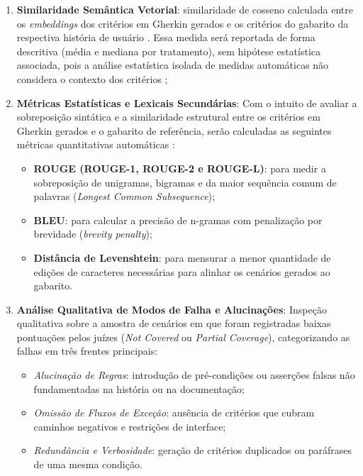 \begin{enumerate}
    \item \textbf{Similaridade Semântica Vetorial}: similaridade de cosseno calculada entre os \textit{embeddings} dos critérios em Gherkin gerados e os critérios do gabarito da respectiva história de usuário \cite{wang2025}. Essa medida será reportada de forma descritiva (média e mediana por tratamento), sem hipótese estatística associada, pois a análise estatística isolada de medidas automáticas não considera o contexto dos critérios \cite{wang2025};

    \item \textbf{Métricas Estatísticas e Lexicais Secundárias}: Com o intuito de avaliar a sobreposição sintática e a similaridade estrutural entre os critérios em Gherkin gerados e o gabarito de referência, serão calculadas as seguintes métricas quantitativas automáticas \cite{wang2025}:
    \begin{itemize}
        \item \textbf{ROUGE (ROUGE-1, ROUGE-2 e ROUGE-L)}: para medir a sobreposição de unigramas, bigramas e da maior sequência comum de palavras (\textit{Longest Common Subsequence});
        \item \textbf{BLEU}: para calcular a precisão de n-gramas com penalização por brevidade (\textit{brevity penalty});
        \item \textbf{Distância de Levenshtein}: para mensurar a menor quantidade de edições de caracteres necessárias para alinhar os cenários gerados ao gabarito.
    \end{itemize}

    \item \textbf{Análise Qualitativa de Modos de Falha e Alucinações}: Inspeção qualitativa sobre a amostra de cenários em que foram registradas baixas pontuações pelos juízes (\textit{Not Covered} ou \textit{Partial Coverage}), categorizando as falhas em três frentes principais:
    \begin{itemize}
        \item \textit{Alucinação de Regras}: introdução de pré-condições ou asserções falsas não fundamentadas na história ou na documentação;
        \item \textit{Omissão de Fluxos de Exceção}: ausência de critérios que cubram caminhos negativos e restrições de interface;
        \item \textit{Redundância e Verbosidade}: geração de critérios duplicados ou paráfrases de uma mesma condição.
    \end{itemize}
\end{enumerate}